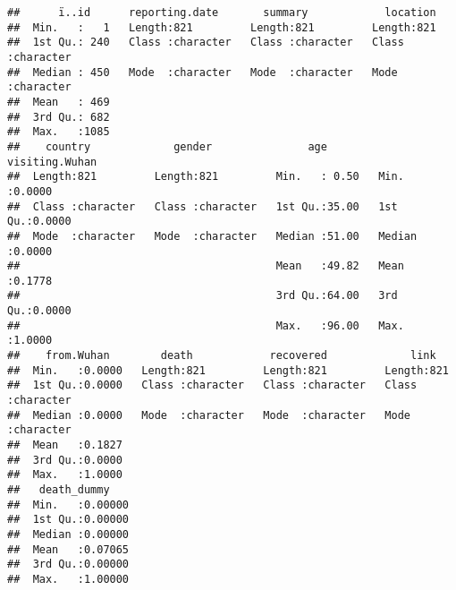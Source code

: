\documentclass[
]{article}
\newenvironment{Shaded}{\begin{snugshade}}{\end{snugshade}}
\newcommand{\AttributeTok}[1]{\textcolor[rgb]{0.77,0.63,0.00}{#1}}
\newcommand{\CommentTok}[1]{\textcolor[rgb]{0.56,0.35,0.01}{\textit{#1}}}
\newcommand{\DecValTok}[1]{\textcolor[rgb]{0.00,0.00,0.81}{#1}}
\newcommand{\FunctionTok}[1]{\textcolor[rgb]{0.00,0.00,0.00}{#1}}
\newcommand{\NormalTok}[1]{#1}
\newcommand{\OtherTok}[1]{\textcolor[rgb]{0.56,0.35,0.01}{#1}}
\newcommand{\SpecialCharTok}[1]{\textcolor[rgb]{0.00,0.00,0.00}{#1}}
\newcommand{\StringTok}[1]{\textcolor[rgb]{0.31,0.60,0.02}{#1}}
\begin{document}
\begin{verbatim}
##      ï..id      reporting.date       summary            location        
##  Min.   :   1   Length:821         Length:821         Length:821        
##  1st Qu.: 240   Class :character   Class :character   Class :character  
##  Median : 450   Mode  :character   Mode  :character   Mode  :character  
##  Mean   : 469                                                           
##  3rd Qu.: 682                                                           
##  Max.   :1085                                                           
##    country             gender               age        visiting.Wuhan  
##  Length:821         Length:821         Min.   : 0.50   Min.   :0.0000  
##  Class :character   Class :character   1st Qu.:35.00   1st Qu.:0.0000  
##  Mode  :character   Mode  :character   Median :51.00   Median :0.0000  
##                                        Mean   :49.82   Mean   :0.1778  
##                                        3rd Qu.:64.00   3rd Qu.:0.0000  
##                                        Max.   :96.00   Max.   :1.0000  
##    from.Wuhan        death            recovered             link          
##  Min.   :0.0000   Length:821         Length:821         Length:821        
##  1st Qu.:0.0000   Class :character   Class :character   Class :character  
##  Median :0.0000   Mode  :character   Mode  :character   Mode  :character  
##  Mean   :0.1827                                                           
##  3rd Qu.:0.0000                                                           
##  Max.   :1.0000                                                           
##   death_dummy     
##  Min.   :0.00000  
##  1st Qu.:0.00000  
##  Median :0.00000  
##  Mean   :0.07065  
##  3rd Qu.:0.00000  
##  Max.   :1.00000
\end{verbatim}

\begin{Shaded}
\end{Shaded}
\end{document}
